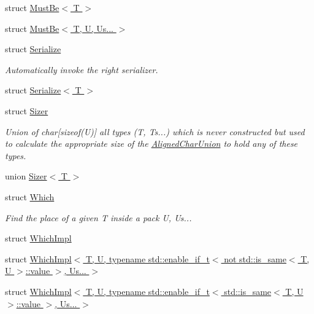 \begin{DoxyCompactItemize}
struct \hyperlink{structvt_1_1util_1_1adt_1_1detail_1_1_must_be_3_01_t_01_4}{Must\+Be$<$ T $>$}
\item 
struct \hyperlink{structvt_1_1util_1_1adt_1_1detail_1_1_must_be_3_01_t_00_01_u_00_01_us_8_8_8_01_4}{Must\+Be$<$ T, U, Us... $>$}
\item 
struct \hyperlink{structvt_1_1util_1_1adt_1_1detail_1_1_serialize}{Serialize}
\begin{DoxyCompactList}\small\item\em Automatically invoke the right serializer. \end{DoxyCompactList}\item 
struct \hyperlink{structvt_1_1util_1_1adt_1_1detail_1_1_serialize_3_01_t_01_4}{Serialize$<$ T $>$}
\item 
struct \hyperlink{unionvt_1_1util_1_1adt_1_1detail_1_1_sizer}{Sizer}
\begin{DoxyCompactList}\small\item\em Union of char\mbox{[}sizeof(\+U)\mbox{]} all types (T, Ts...) which is never constructed but used to calculate the appropriate size of the {\ttfamily \hyperlink{structvt_1_1util_1_1adt_1_1_aligned_char_union}{Aligned\+Char\+Union}} to hold any of these types. \end{DoxyCompactList}\item 
union \hyperlink{unionvt_1_1util_1_1adt_1_1detail_1_1_sizer_3_01_t_01_4}{Sizer$<$ T $>$}
\item 
struct \hyperlink{structvt_1_1util_1_1adt_1_1detail_1_1_which}{Which}
\begin{DoxyCompactList}\small\item\em Find the place of a given {\ttfamily T} inside a pack {\ttfamily U}, Us... \end{DoxyCompactList}\item 
struct \hyperlink{structvt_1_1util_1_1adt_1_1detail_1_1_which_impl}{Which\+Impl}
\item 
struct \hyperlink{structvt_1_1util_1_1adt_1_1detail_1_1_which_impl_3_01_t_00_01_u_00_01typename_01std_1_1enable__i4d9447de0f2954cce0452213fa3ad5db}{Which\+Impl$<$ T, U, typename std\+::enable\+\_\+if\+\_\+t$<$ not std\+::is\+\_\+same$<$ T, U $>$\+::value $>$, Us... $>$}
\item 
struct \hyperlink{structvt_1_1util_1_1adt_1_1detail_1_1_which_impl_3_01_t_00_01_u_00_01typename_01std_1_1enable__i0f067a3d2e31ed39b40aceedb711df3e}{Which\+Impl$<$ T, U, typename std\+::enable\+\_\+if\+\_\+t$<$ std\+::is\+\_\+same$<$ T, U $>$\+::value $>$, Us... $>$}
\end{DoxyCompactItemize}
